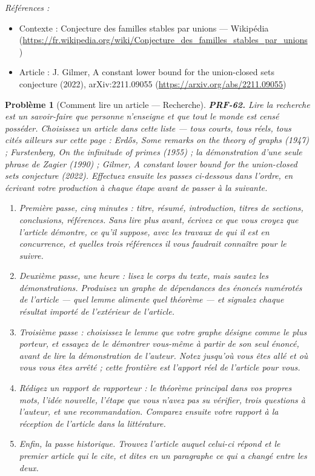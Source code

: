 \documentclass[11pt]{article}
\newtheorem{problem}{Problème}
\newenvironment{refs}{\par\small\noindent\emph{Références :}\begin{itemize}\setlength\itemsep{0pt}}{\end{itemize}\normalsize}
\begin{document}
\begin{refs}
\item Contexte : Conjecture des familles stables par unions --- Wikipédia (\url{https://fr.wikipedia.org/wiki/Conjecture_des_familles_stables_par_unions})
\item Article : J. Gilmer, \og{} A constant lower bound for the union-closed sets conjecture \fg{} (2022), arXiv:2211.09055 (\url{https://arxiv.org/abs/2211.09055})
\end{refs}

\bigskip

\begin{problem}[{Comment lire un article --- Recherche}]
\textbf{PRF-62.} Lire la recherche est un savoir-faire que personne n'enseigne et que
tout le monde est censé posséder. Choisissez un article dans cette liste --- tous courts, tous
réels, tous cités ailleurs sur cette page : Erd\H{o}s, \og{} Some remarks on the theory of graphs \fg{}
(1947) ; Furstenberg, \og{} On the infinitude of primes \fg{} (1955) ; la démonstration d'une seule
phrase de Zagier (1990) ; Gilmer, \og{} A constant lower bound for the union-closed sets
conjecture \fg{} (2022). Effectuez ensuite les passes ci-dessous dans l'ordre, en écrivant votre
production à chaque étape avant de passer à la suivante.
\begin{enumerate}
\item[(a)] Première passe, cinq minutes : titre, résumé, introduction, titres de sections,
conclusions, références. Sans lire plus avant, écrivez ce que vous croyez que l'article
démontre, ce qu'il suppose, avec les travaux de qui il est en concurrence, et quelles trois
références il vous faudrait connaître pour le suivre.
\item[(b)] Deuxième passe, une heure : lisez le corps du texte, mais sautez les démonstrations.
Produisez un graphe de dépendances des énoncés numérotés de l'article --- quel lemme alimente
quel théorème --- et signalez chaque résultat importé de l'extérieur de l'article.
\item[(c)] Troisième passe : choisissez le lemme que votre graphe désigne comme le plus porteur, et
essayez de le démontrer vous-même à partir de son seul énoncé, avant de lire la
démonstration de l'auteur. Notez jusqu'où vous êtes allé et où vous vous êtes arrêté ; cette
frontière est l'apport réel de l'article pour vous.
\item[(d)] Rédigez un rapport de rapporteur : le théorème principal dans vos propres mots, l'idée
nouvelle, l'étape que vous n'avez pas su vérifier, trois questions à l'auteur, et une
recommandation. Comparez ensuite votre rapport à la réception de l'article dans la
littérature.
\item[(e)] Enfin, la passe historique. Trouvez l'article auquel celui-ci répond et le premier
article qui le cite, et dites en un paragraphe ce qui a changé entre les deux.
\end{enumerate}

\end{problem}
\end{document}
